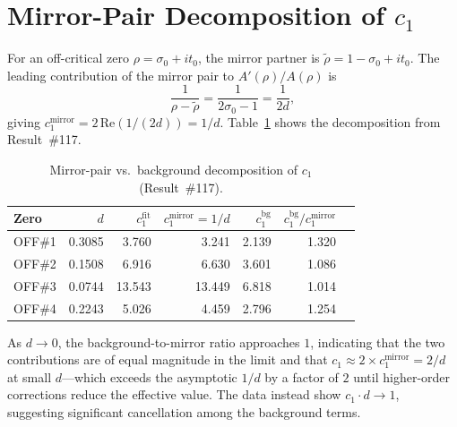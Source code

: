 \documentclass[11pt, a4paper]{article}
\theoremstyle{plain}
\theoremstyle{definition}
\begin{document}
\section{Mirror-Pair Decomposition of $c_{1}$}
\label{app:mirror}

For an off-critical zero $\rho=\sigma_{0}+it_{0}$, the mirror partner
is $\tilde\rho=1-\sigma_{0}+it_{0}$.  The leading contribution of the
mirror pair to $A'(\rho)/A(\rho)$ is
\[
  \frac{1}{\rho-\tilde\rho} = \frac{1}{2\sigma_{0}-1} = \frac{1}{2d},
\]
giving $c_{1}^{\text{mirror}} = 2\,\mathrm{Re}(1/(2d)) = 1/d$.
Table~\ref{tab:mirror} shows the decomposition from Result~\#117.

\begin{table}[ht]
\centering
\caption{Mirror-pair vs.\ background decomposition of $c_{1}$ (Result~\#117).}
\label{tab:mirror}
\small
\begin{tabular}{lrrrrrr}
\toprule
Zero & $d$ & $c_{1}^{\text{fit}}$ & $c_{1}^{\text{mirror}}=1/d$ & $c_{1}^{\text{bg}}$ & $c_{1}^{\text{bg}}/c_{1}^{\text{mirror}}$ \\
\midrule
OFF\#1 & 0.3085 & 3.760 & 3.241 & 2.139 & 1.320 \\
OFF\#2 & 0.1508 & 6.916 & 6.630 & 3.601 & 1.086 \\
OFF\#3 & 0.0744 & 13.543 & 13.449 & 6.818 & 1.014 \\
OFF\#4 & 0.2243 & 5.026 & 4.459 & 2.796 & 1.254 \\
\bottomrule
\end{tabular}
\end{table}

As $d\to 0$, the background-to-mirror ratio approaches $1$, indicating
that the two contributions are of equal magnitude in the limit and that
$c_{1}\approx 2\times c_{1}^{\text{mirror}}=2/d$ at small $d$---which
exceeds the asymptotic $1/d$ by a factor of $2$ until higher-order
corrections reduce the effective value.  The data instead show
$c_{1}\cdot d\to 1$, suggesting significant cancellation among the
background terms.
\end{document}
